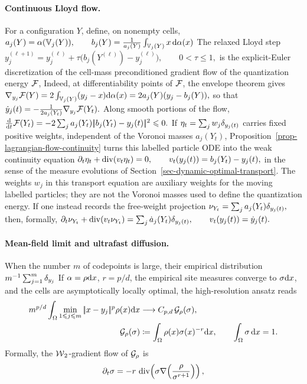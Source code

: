 \paragraph{Continuous Lloyd flow.}
For a configuration \(Y\), define, on nonempty cells, \(a_j(Y)=\alpha(\mathbb{V}_j(Y)), \qquad b_j(Y)=\frac{1}{a_j(Y)}\int_{\mathbb{V}_j(Y)}x\,\mathrm{d}\alpha(x)\)
The relaxed Lloyd step
\(y_j^{(\ell+1)}=y_j^{(\ell)}+\tau\big(b_j(Y^{(\ell)})-y_j^{(\ell)}\big), \qquad 0<\tau\leq 1,\)
is the explicit-Euler discretization of the cell-mass preconditioned gradient flow of the quantization energy \(\mathcal{F}\),
Indeed, at differentiability points of \(\mathcal{F}\), the envelope theorem gives \(\nabla_{y_j}\mathcal{F}(Y) = 2\int_{\mathbb{V}_j(Y)}(y_j-x)\mathrm{d}\alpha(x) = 2a_j(Y)(y_j-b_j(Y)),\)
so that
\(\dot y_j(t) = -\frac{1}{2a_j(Y_t)}\nabla_{y_j}\mathcal{F}(Y_t).\)
Along smooth portions of the flow, \(\frac{\mathrm{d}}{\mathrm{d} t}\mathcal{F}(Y_t) = -2\sum_j a_j(Y_t)|\!| b_j(Y_t)-y_j(t) |\!|^2 \leqslant 0.\)
If \(\eta_t=\sum_j w_j\delta_{y_j(t)}\) carries fixed positive weights, independent of the Voronoi masses \(a_j(Y_t)\), Proposition~\ref{prop-lagrangian-flow-continuity} turns this labelled particle ODE into the weak continuity equation
\(\partial_t\eta_t+\operatorname{div}(v_t\eta_t)=0, \qquad v_t(y_j(t))=b_j(Y_t)-y_j(t),\)
in the sense of the measure evolutions of Section~\ref{sec-dynamic-optimal-transport}. The weights \(w_j\) in this transport equation are auxiliary weights for the moving labelled particles; they are not the Voronoi masses used to define the quantization energy. If one instead records the free-weight projection
\(\nu_{Y_t}=\sum_j a_j(Y_t)\delta_{y_j(t)},\)
then, formally, \(\partial_t\nu_{Y_t}+\operatorname{div}(v_t\nu_{Y_t}) = \sum_j \dot a_j(Y_t)\delta_{y_j(t)}, \qquad v_t(y_j(t))=\dot y_j(t).\)
\paragraph{Mean-field limit and ultrafast diffusion.}
When the number \(m\) of codepoints is large, their empirical distribution
\(
m^{-1}\sum_{j=1}^m\delta_{y_j}
\)
If \(\alpha=\rho\mathrm{d} x\), \(r=p/d\), the empirical site measures converge to \(\sigma\mathrm{d} x\), and the cells are asymptotically locally optimal, the high-resolution ansatz reads
\[
\begin{aligned}
m^{p/d}\int_\Omega \min_{1\leqslant j\leqslant m}|\!| x-y_j |\!|^{p}\rho(x)\mathrm{d} x
&\longrightarrow C_{p,d}\,\mathcal{G}_\rho(\sigma),\\
\mathcal{G}_\rho(\sigma)
&\coloneqq \int_\Omega \rho(x) \sigma(x)^{-r}\mathrm{d} x,
\qquad \int_\Omega \sigma\,\mathrm{d} x=1.
\end{aligned}
\]
Formally, the \(\operatorname{\mathcal{W}}_2\)-gradient flow of \(\mathcal{G}_\rho\) is
\[
\partial_t \sigma
=
-r\,\operatorname{div}\!\left(
\sigma\nabla\!\left(\frac{\rho}{\sigma^{r+1}}\right)
\right),
\]
